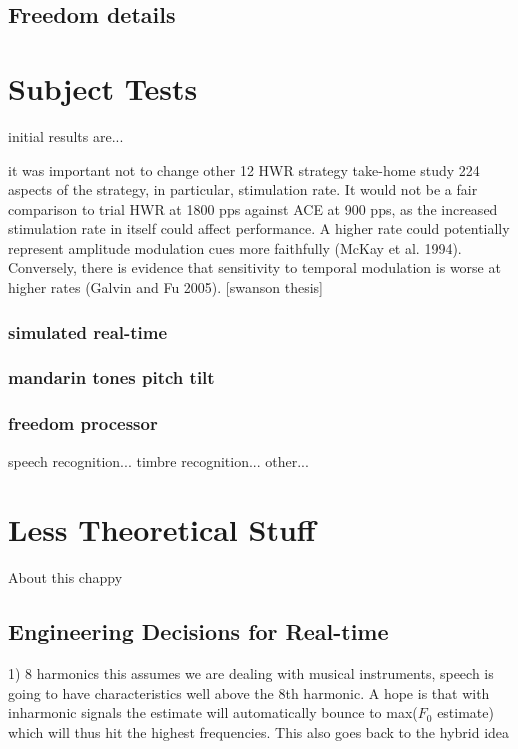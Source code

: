 \documentclass [11pt, proquest] {uwthesis}[2015/03/03]
\begin{document}
\section{Freedom details}


\chapter{Subject Tests}
initial results are...



 it was important not to change other
12 HWR strategy take-home study 224
aspects of the strategy, in particular, stimulation rate. It would not be a fair comparison to trial HWR at 1800 pps against ACE at 900 pps, as the increased stimulation rate in itself could affect performance. A higher rate could potentially represent amplitude modulation cues more faithfully (McKay et al. 1994). Conversely, there is evidence that sensitivity to temporal modulation is worse at higher rates (Galvin and Fu 2005).
[swanson thesis]

    \subsection{simulated real-time}
    
    \subsection{mandarin tones pitch tilt}
    
    \subsection{freedom processor}
        speech recognition...
        timbre recognition...
        other...


 
\chapter{Less Theoretical Stuff}

About this chappy

\section{Engineering Decisions for Real-time}

1) 8 harmonics
this assumes we are dealing with musical instruments, speech is going to have characteristics well above the 8th harmonic.  A hope is that with inharmonic signals the estimate will automatically bounce to max($F_0$ estimate) which will thus hit the highest frequencies.  This also goes back to the hybrid idea
\end{document}
